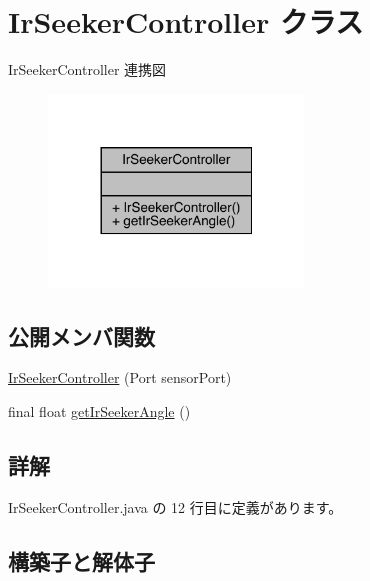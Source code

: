\hypertarget{class_ir_seeker_controller}{}\section{Ir\+Seeker\+Controller クラス}
\label{class_ir_seeker_controller}


Ir\+Seeker\+Controller 連携図\nopagebreak
\begin{figure}[H]
\begin{center}
\leavevmode
\includegraphics[width=192pt]{d0/d4d/class_ir_seeker_controller__coll__graph}
\end{center}
\end{figure}
\subsection*{公開メンバ関数}
\begin{DoxyCompactItemize}
\item 
\mbox{\hyperlink{class_ir_seeker_controller_a5013fb830f68f74855f46d6748af1a71}{Ir\+Seeker\+Controller}} (Port sensor\+Port)
\item 
final float \mbox{\hyperlink{class_ir_seeker_controller_a71fb9a9096eebd286ef0f02c6f603468}{get\+Ir\+Seeker\+Angle}} ()
\end{DoxyCompactItemize}


\subsection{詳解}


 Ir\+Seeker\+Controller.\+java の 12 行目に定義があります。



\subsection{構築子と解体子}
\mbox{\label{class_ir_seeker_controller_a5013fb830f68f74855f46d6748af1a71}} 
